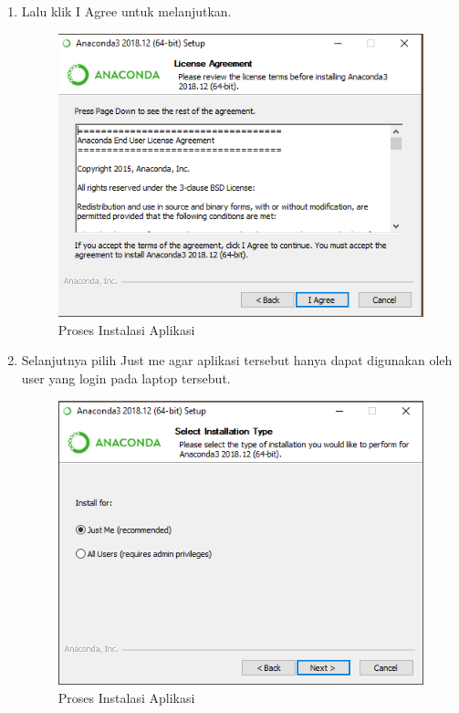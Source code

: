 \begin{enumerate}
\item Lalu klik I Agree untuk melanjutkan.
\begin{figure}[ht]
\centering
\includegraphics[scale=0.7]{figures/3.png}
\caption{Proses Instalasi Aplikasi}
\end{figure}

\item Selanjutnya pilih Just me agar aplikasi tersebut hanya dapat digunakan oleh user yang login pada laptop tersebut.
\begin{figure}[ht]
\centering
\includegraphics[scale=0.7]{figures/4.png}
\caption{Proses Instalasi Aplikasi}
\end{figure}


\end{enumerate}
